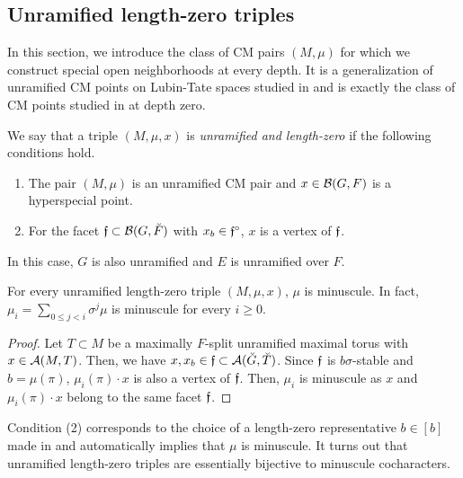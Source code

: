\documentclass[12pt,reqno]{amsart}
\begin{document}
\subsection{Unramified length-zero triples} \label{ssec:unramified_length_0_triple}

In this section, we introduce the class of CM pairs $(M, \mu)$ for which we construct special open neighborhoods at every depth. It is a generalization of unramified CM points on Lubin-Tate spaces studied in \cite{BW16} and is exactly the class of CM points studied in \cite{Tak25z} at depth zero. 

\begin{defi} \label{defi:unramified_length_0}
    We say that a triple $(M, \mu, x)$ is \textit{unramified and length-zero} if the following conditions hold. 
    \begin{enumerate}
        \item The pair $(M, \mu)$ is an unramified CM pair and $x \in {\mathcal{B}}(G, F)$ is a hyperspecial point. 
        \item For the facet ${\mathfrak{f}} \subset {\mathcal{B}}(G, \breve{F})$ with $x_b \in {\mathfrak{f}}^\circ$, $x$ is a vertex of ${\mathfrak{f}}$. 
    \end{enumerate}
    In this case, $G$ is also unramified and $E$ is unramified over $F$. 
\end{defi}

\begin{lem} \label{lem:automatic_minuscule}
    For every unramified length-zero triple $(M, \mu, x)$, $\mu$ is minuscule. In fact, $\mu_i = \sum_{0 \leq j < i} \sigma^j \mu$ is minuscule for every $i \geq 0$. 
\end{lem}
\begin{proof}
    Let $T \subset M$ be a maximally $F$-split unramified maximal torus with $x \in {\mathcal{A}}(M, T)$. Then, we have $x, x_b \in {\mathfrak{f}} \subset {\mathcal{A}}(\breve{G}, \breve{T})$. Since ${\mathfrak{f}}$ is $b\sigma$-stable and $b = \mu(\pi)$, $\mu_i(\pi) \cdot x$ is also a vertex of ${\mathfrak{f}}$. Then, $\mu_i$ is minuscule as $x$ and $\mu_i(\pi) \cdot x$ belong to the same facet ${\mathfrak{f}}$. 
\end{proof}

Condition (2) corresponds to the choice of a length-zero representative $b \in [b]$ made in \cite{Tak25z} and automatically implies that $\mu$ is minuscule. It turns out that unramified length-zero triples are essentially bijective to minuscule cocharacters. 
\end{document}
